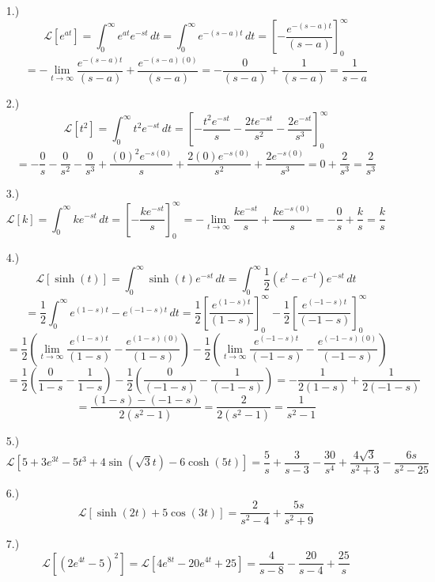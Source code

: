 \documentclass[12pt]{article}
\newcommand{\bracks}[1]{\left[#1\right]}
\newcommand{\parns}[1]{\left(#1\right)}
\newcommand{\lgr}{\mathcal{L}}
\begin{document}
\pagestyle{fancy}
\fancyhead{}

\normalsize
\begin{itemize}
    \item [1.)] \[\lgr\bracks{e^{at}}=\int_0^\infty e^{at}e^{-st}\,dt=\int_0^\infty e^{-(s-a)t}\,dt=\bracks{-\frac{e^{-(s-a)t}}{(s-a)}}^\infty_0\]
    \[=-\lim_{t\to\infty}\frac{e^{-(s-a)t}}{(s-a)}+\frac{e^{-(s-a)(0)}}{(s-a)}=-\frac{0}{(s-a)}+\frac{1}{(s-a)}=\frac{1}{s-a}\]

    \item [2.)] \[\lgr\bracks{t^2}=\int_0^\infty t^2e^{-st}\,dt=\bracks{-\frac{t^2e^{-st}}{s}-\frac{2te^{-st}}{s^2}-\frac{2e^{-st}}{s^3}}^\infty_0\]
    \[=-\frac{0}{s}-\frac{0}{s^2}-\frac{0}{s^3}+\frac{(0)^2e^{-s(0)}}{s}+\frac{2(0)e^{-s(0)}}{s^2}+\frac{2e^{-s(0)}}{s^3}=0+\frac{2}{s^3}=\frac{2}{s^3}\]

    \item [3.)] \[\lgr\bracks{k}=\int^\infty_0ke^{-st}\,dt=\bracks{-\frac{ke^{-st}}{s}}^\infty_0=-\lim_{t\to\infty}\frac{ke^{-st}}{s}+\frac{ke^{-s(0)}}{s}=-\frac{0}{s}+\frac{k}{s}=\frac{k}{s}\]

    \item [4.)] \[\lgr\bracks{\sinh(t)}=\int^\infty_0\sinh(t)e^{-st}\,dt=\int^\infty_0\frac{1}{2}\parns{e^t-e^{-t}}e^{-st}\,dt\]
    \[=\frac{1}{2}\int^\infty_0e^{(1-s)t}-e^{(-1-s)t}\,dt=\frac{1}{2}\bracks{\frac{e^{(1-s)t}}{(1-s)}}^\infty_0-\frac{1}{2}\bracks{\frac{e^{(-1-s)t}}{(-1-s)}}^\infty_0\]
    \[=\frac{1}{2}\parns{\lim_{t\to\infty}\frac{e^{(1-s)t}}{(1-s)}-\frac{e^{(1-s)(0)}}{(1-s)}}-\frac{1}{2}\parns{\lim_{t\to\infty}\frac{e^{(-1-s)t}}{(-1-s)}-\frac{e^{(-1-s)(0)}}{(-1-s)}}\]
    \[=\frac{1}{2}\parns{\frac{0}{1-s}-\frac{1}{1-s}}-\frac{1}{2}\parns{\frac{0}{(-1-s)}-\frac{1}{(-1-s)}}=-\frac{1}{2(1-s)}+\frac{1}{2(-1-s)}\]
    \[=\frac{(1-s)-(-1-s)}{2(s^2-1)}=\frac{2}{2(s^2-1)}=\frac{1}{s^2-1}\]

    \item [5.)] \[\lgr\bracks{5+3e^{3t}-5t^3+4\sin\parns{\sqrt3t}-6\cosh(5t)}=\frac{5}{s}+\frac{3}{s-3}-\frac{30}{s^4}+\frac{4\sqrt3}{s^2+3}-\frac{6s}{s^2-25}\]

    \item [6.)] \[\lgr\bracks{\sinh(2t)+5\cos(3t)}=\frac{2}{s^2-4}+\frac{5s}{s^2+9}\]

    \item [7.)] \[\lgr\bracks{(2e^{4t}-5)^2}=\lgr\bracks{4e^{8t}-20e^{4t}+25}=\frac{4}{s-8}-\frac{20}{s-4}+\frac{25}{s}\]


\end{itemize}
\end{document}
